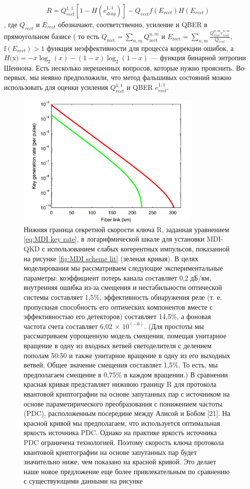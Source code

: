 \begin{align}
    R = Q_{rect}^{1,1}[1-H(e_{diag}^{1,1})] - Q_{rect}f(E_{rect})H(E_{rect})
\end{align} \label{eq:MDI key rate},
где $Q_{rect}$ и $E_{rect}$ обозначают, соответственно, усиление и QBER в прямоугольном базисе ( то есть $  Q_{\text{rect}} = \sum_{n,m} Q_{\text{rect}}^{n,m}  $ и $E_{\text{rect}} =\sum_{n,m} \frac{Q_{rect}^{n,m}e_{rect}^{n,m}}{Q_{rect}}$, $\text{f}(E_{rect}) > 1$ функция неэффективности для процесса коррекции ошибок, а $H\text{(x)} = - x\log_2(x) - (1 - x)\log_2(1-x) $ — функция бинарной энтропии Шеннона. Есть несколько нерешенных вопросов, которые нужно прояснить. Во-первых, мы неявно предположили, что метод фальшивых состояний можно использовать для оценки усиления $Q_{rect}^{1,1}$ и QBER $e_{rect}^{1,1}$. 
\begin{figure}
    \centering
    \includegraphics[width=0.8\textwidth]{images/mdi speed.png}
    \caption{Нижняя граница секретной скорости ключа R, заданная уравнением \ref{eq:MDI key rate}, в логарифмической шкале для установки MDI-QKD с использованием слабых когерентных импульсов, показанной на рисунке \ref{fig:MDI scheme lit} (зеленая кривая). В целях моделирования мы рассматриваем следующие экспериментальные параметры: коэффициент потерь канала составляет 0,2 дБ/км, внутренняя ошибка из-за смещения и нестабильности оптической системы составляет 1,5\%, эффективность обнаружения реле (т. е. пропускная способность его оптических компонентов вместе с эффективностью его детекторов) составляет 14,5\%, а фоновая частота счета составляет 6,02 × $10^(-6)$. (Для простоты мы рассматриваем упрощенную модель смещения, помещая унитарное вращение в одну из входных ветвей светоделителя с делением пополам 50:50 и также унитарное вращение в одну из его выходных ветвей. Общее значение смещения составляет 1,5\%. То есть, мы предполагаем смещение в 0,75\% в каждом вращении.) В сравнении красная кривая представляет нижнюю границу R для протокола квантовой криптографии на основе запутанных пар с источником на основе параметирического преобразования с понижением частоты (PDC), расположенным посередине между Алисой и Бобом [21]. На красной кривой мы предполагаем, что используется оптимальная яркость источника PDC. Однако на практике яркость источника PDC ограничена технологией. Поэтому скорость ключа протокола квантовой криптографии на основе запутанных пар будет значительно ниже, чем показано на красной кривой. Это делает наше новое предложение еще более привлекательным по сравнению с существующими данными на рисунке}

\end{figure}
